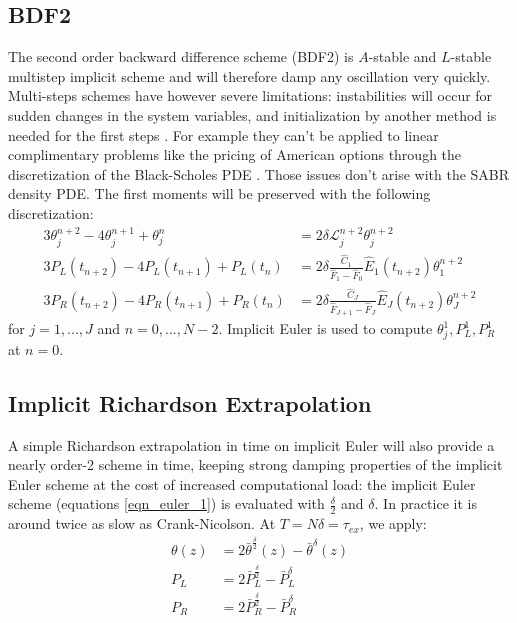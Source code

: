 \documentclass[]{rAMF2e}
\begin{document}
\subsection{BDF2}
The second order backward difference scheme (BDF2) is $A$-stable and $L$-stable multistep implicit scheme and will therefore damp any oscillation very quickly. Multi-steps schemes have however severe limitations: instabilities will occur for sudden changes in the system variables, and initialization by another method is needed for the first steps \citep{windcliff2001shout}. For example they can't be applied to linear complimentary problems like the pricing of American options through the discretization of the Black-Scholes PDE \citep{lefloc2013tr}. Those issues don't arise with the SABR density PDE. The first moments will be preserved with the following discretization:
\begin{subequations}
\begin{align}
3\theta_j^{n+2}-4\theta_j^{n+1}+\theta_j^n &= 2 \delta \mathcal{L}_{j}^{n+2} \theta_j^{n+2} \\
3 P_L (t_{n+2}) - 4 P_L (t_{n+1}) + P_L (t_{n}) &=2 \delta \frac{\hat{C}_1}{\hat{F}_1-\hat{F}_0}\hat{E}_1(t_{n+2})\theta_1^{n+2} \\
3 P_R (t_{n+2}) - 4 P_R (t_{n+1}) +  P_R (t_{n}) &= 2\delta \frac{\hat{C}_J}{\hat{F}_{J+1}-\hat{F}_J}\hat{E}_J(t_{n+2})\theta_J^{n+2}
\end{align}
\end{subequations}
for $j=1,...,J$ and $n=0,...,N-2$. Implicit Euler is used to compute $\theta_j^1, P_L^1, P_R^1$ at $n=0$.

\subsection{Implicit Richardson Extrapolation}
A simple Richardson extrapolation in time \citep{richardson1911approximate} on implicit Euler will also provide a nearly order-2 scheme in time, keeping strong damping properties of the implicit Euler scheme at the cost of increased computational load: the implicit Euler scheme (equations \ref{eqn_euler_1}) is evaluated with $\frac{\delta}{2}$ and $\delta$. In practice it is around twice as slow as Crank-Nicolson. At $T=N\delta=\tau_{ex}$, we apply:
\begin{align}\label{eqn_richardson}
\theta(z) &= 2 \bar{\theta}^{\frac{\delta}{2}}(z) - \bar{\theta}^{\delta}(z) \\
P_L &= 2 \bar{P}^{\frac{\delta}{2}}_L - \bar{P}^{\delta}_L\\
P_R &= 2 \bar{P}^{\frac{\delta}{2}}_R - \bar{P}^{\delta}_R
\end{align}
\end{document}
